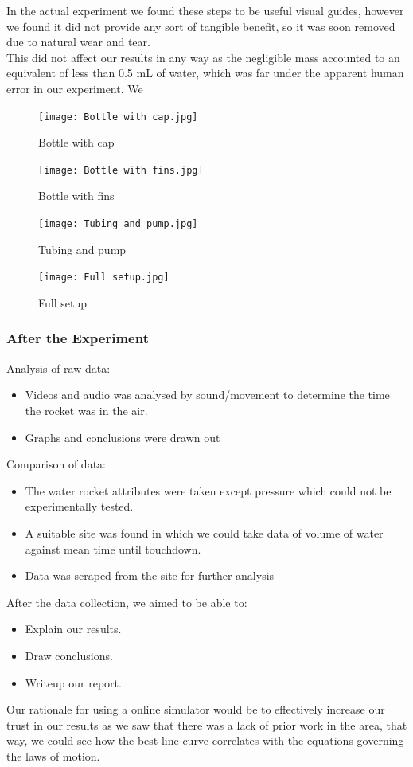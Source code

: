 \documentclass[14pt]{article}
\begin{document}
In the actual experiment we found these steps to be useful visual guides, however we found it did not provide any sort of tangible benefit, so it was soon removed due to natural wear and tear. \\This did not affect our results in any way as the negligible mass accounted to an equivalent of less than 0.5 mL of water, which was far under the apparent human error in our experiment. We
\begin{figure}[h]
    \centering
    \texttt{[image: Bottle with cap.jpg]}
    \caption{Bottle with cap}
    \label{fig:bottle-cap}
\end{figure}
\FloatBarrier

\begin{figure}[h]
    \centering
    \texttt{[image: Bottle with fins.jpg]}
    \caption{Bottle with fins}  
    \label{fig:bottle-fins}
\end{figure}
\FloatBarrier

\begin{figure}[h]
    \centering
    \texttt{[image: Tubing and pump.jpg]}
    \caption{Tubing and pump}
    \label{fig:tubing-pump}
\end{figure}
\FloatBarrier

\begin{figure}[h]
    \centering
    \texttt{[image: Full setup.jpg]}
    \caption{Full setup}
    \label{fig:full-setup}
\end{figure}
\FloatBarrier

\subsubsection{After the Experiment}
Analysis of raw data:
\begin{itemize}
    \item Videos and audio was analysed by sound/movement to determine the time the rocket was in the air.
    \item Graphs and conclusions were drawn out
\end{itemize}
Comparison of data:
\begin{itemize}
    \item The water rocket attributes were taken except pressure which could not be experimentally tested.
    \item A suitable site was found in which we could take data of volume of water against mean time until touchdown.
    \item Data was scraped from the site for further analysis
\end{itemize}
After the data collection, we aimed to be able to:
\begin{itemize}
    \item Explain our results.
    \item Draw conclusions.
    \item Writeup our report.
\end{itemize}
Our rationale for using a online simulator would be to effectively increase our trust in our results as we saw that there was a lack of prior work in the area, that way, we could see how the best line curve correlates with the equations governing the laws of motion.
\end{document}
